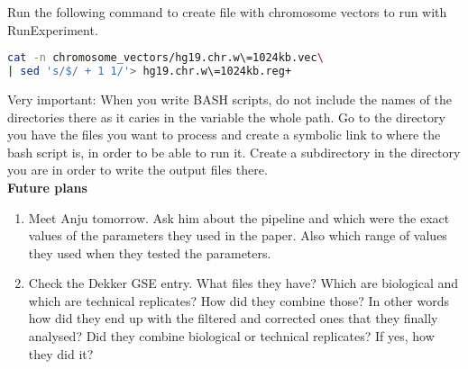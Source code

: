 \documentclass[idxtotoc,hyperref,openany]{labbook} %
\newcommand{\HRule}{\rule{\linewidth}{0.5mm}} %
\begin{document}
    Run the following command to create file with chromosome vectors to run with RunExperiment.

\begin{lstlisting}[language=bash]
cat -n chromosome_vectors/hg19.chr.w\=1024kb.vec\
| sed 's/$/ + 1 1/'> hg19.chr.w\=1024kb.reg+
\end{lstlisting}

Very important: When you write BASH scripts, do not include the names of the directories there as it caries in the variable the whole path. Go to the directory you have the files you want to process and create a symbolic link to where the bash script is, in order to be able to run it. Create a subdirectory in the directory you are in order to write the output files there.\\

\newpage
\textbf{Future plans}

\begin{enumerate}
	\item Meet Anju tomorrow. Ask him about the pipeline and which were the exact values of the parameters they used in the paper. Also which range of values they used when they tested the parameters.
	\item Check the Dekker GSE entry. What files they have? Which are biological and which are technical replicates? How did they combine those? In other words how did they end up with the filtered and corrected ones that they finally analysed? Did they combine biological or technical replicates? If yes, how they did it?
\end{enumerate}









\end{document}
